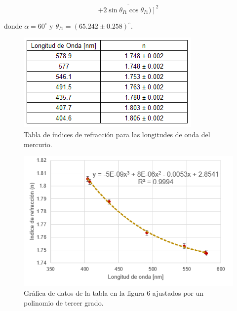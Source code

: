 \documentclass[DIV=calc, paper=a4, fontsize=11pt]{scrartcl}
\begin{document}
\begin{equation*}
    \overline{\left. +2\sin{\theta_{I1}}\cos{\theta_{I1}})\right]^2}
\end{equation*}

donde $\alpha=60^{\circ}$ y $\theta_{I1}=(65.242 \pm 0.258)^{\circ}$.

\begin{figure}[H]
    \centering
    \includegraphics[scale=1]{tablas/1.PNG}
    \caption{Tabla de índices de refracción para las longitudes de onda del mercurio.}
    \label{fig:my_label}
\end{figure}



\begin{figure}[H]
    \centering
    \includegraphics{graficas/1.PNG}
    \caption{Gráfica de datos de la tabla en la figura 6 ajustados por un polinomio de tercer grado.}
    \label{fig:my_label}
\end{figure}
\end{document}
